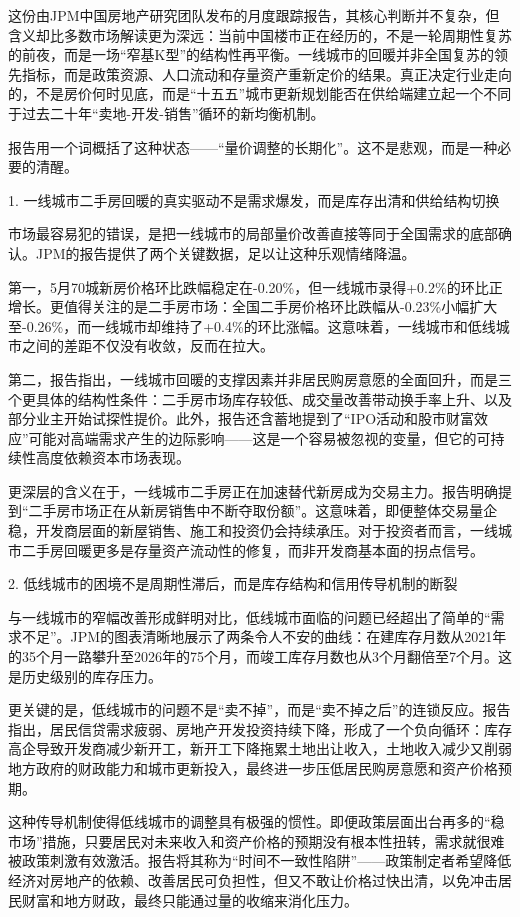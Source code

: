 \documentclass[11pt]{ctexart}
\begin{document}
这份由JPM中国房地产研究团队发布的月度跟踪报告，其核心判断并不复杂，但含义却比多数市场解读更为深远：当前中国楼市正在经历的，不是一轮周期性复苏的前夜，而是一场“窄基K型”的结构性再平衡。一线城市的回暖并非全国复苏的领先指标，而是政策资源、人口流动和存量资产重新定价的结果。真正决定行业走向的，不是房价何时见底，而是“十五五”城市更新规划能否在供给端建立起一个不同于过去二十年“卖地-开发-销售”循环的新均衡机制。

报告用一个词概括了这种状态——“量价调整的长期化”。这不是悲观，而是一种必要的清醒。

1. 一线城市二手房回暖的真实驱动不是需求爆发，而是库存出清和供给结构切换

市场最容易犯的错误，是把一线城市的局部量价改善直接等同于全国需求的底部确认。JPM的报告提供了两个关键数据，足以让这种乐观情绪降温。

第一，5月70城新房价格环比跌幅稳定在-0.20\%，但一线城市录得+0.2\%的环比正增长。更值得关注的是二手房市场：全国二手房价格环比跌幅从-0.23\%小幅扩大至-0.26\%，而一线城市却维持了+0.4\%的环比涨幅。这意味着，一线城市和低线城市之间的差距不仅没有收敛，反而在拉大。

第二，报告指出，一线城市回暖的支撑因素并非居民购房意愿的全面回升，而是三个更具体的结构性条件：二手房市场库存较低、成交量改善带动换手率上升、以及部分业主开始试探性提价。此外，报告还含蓄地提到了“IPO活动和股市财富效应”可能对高端需求产生的边际影响——这是一个容易被忽视的变量，但它的可持续性高度依赖资本市场表现。

更深层的含义在于，一线城市二手房正在加速替代新房成为交易主力。报告明确提到“二手房市场正在从新房销售中不断夺取份额”。这意味着，即便整体交易量企稳，开发商层面的新屋销售、施工和投资仍会持续承压。对于投资者而言，一线城市二手房回暖更多是存量资产流动性的修复，而非开发商基本面的拐点信号。

2. 低线城市的困境不是周期性滞后，而是库存结构和信用传导机制的断裂

与一线城市的窄幅改善形成鲜明对比，低线城市面临的问题已经超出了简单的“需求不足”。JPM的图表清晰地展示了两条令人不安的曲线：在建库存月数从2021年的35个月一路攀升至2026年的75个月，而竣工库存月数也从3个月翻倍至7个月。这是历史级别的库存压力。

更关键的是，低线城市的问题不是“卖不掉”，而是“卖不掉之后”的连锁反应。报告指出，居民信贷需求疲弱、房地产开发投资持续下降，形成了一个负向循环：库存高企导致开发商减少新开工，新开工下降拖累土地出让收入，土地收入减少又削弱地方政府的财政能力和城市更新投入，最终进一步压低居民购房意愿和资产价格预期。

这种传导机制使得低线城市的调整具有极强的惯性。即便政策层面出台再多的“稳市场”措施，只要居民对未来收入和资产价格的预期没有根本性扭转，需求就很难被政策刺激有效激活。报告将其称为“时间不一致性陷阱”——政策制定者希望降低经济对房地产的依赖、改善居民可负担性，但又不敢让价格过快出清，以免冲击居民财富和地方财政，最终只能通过量的收缩来消化压力。
\end{document}
